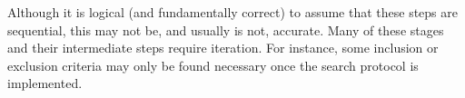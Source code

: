 Although it is logical (and fundamentally correct) to assume that these
steps are sequential, this may not be, and usually is not, accurate.
Many of these stages and their intermediate steps require iteration. For
instance, some inclusion or exclusion criteria may only be found
necessary once the search protocol is implemented.







